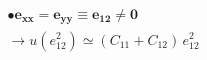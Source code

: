 \documentclass[preview]{standalone}
\begin{document}
\begin{align*}
&\boldsymbol{ \bullet e_{xx}=e_{yy}\equiv e_{12} \neq 0} \\
            & \rightarrow u(e_{12}^2) \simeq (C_{11}+C_{12})\,e_{12}^2
\end{align*}
\end{document}
